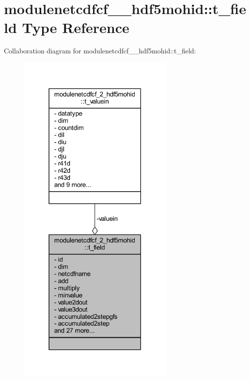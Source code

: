 \hypertarget{structmodulenetcdfcf__2__hdf5mohid_1_1t__field}{}\section{modulenetcdfcf\+\_\+\_\+hdf5mohid\+:\+:t\+\_\+field Type Reference}
\label{structmodulenetcdfcf__2__hdf5mohid_1_1t__field}


Collaboration diagram for modulenetcdfcf\+\_\+\_\+hdf5mohid\+:\+:t\+\_\+field\+:\nopagebreak
\begin{figure}[H]
\begin{center}
\leavevmode
\includegraphics[width=222pt]{structmodulenetcdfcf__2__hdf5mohid_1_1t__field__coll__graph}
\end{center}
\end{figure}
